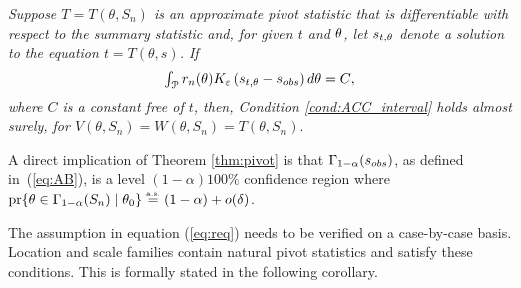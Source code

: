 \noindent
\begin{thm} \label{thm:pivot} 
{\it Suppose $T = T(\theta, S_{n})$ is an approximate pivot statistic that is differentiable with respect to the summary statistic and, for given $t$ and $\btheta$,  let $s_{t, \btheta}$ denote a solution to the equation $t = T(\theta, s)$.  If 
		\begin{equation}\label{eq:req}
		\hbox{$\int_{\cal{P}}  r_{n}(\theta) K_{ \veps}\left(s_{t, \theta}-s_{\rm obs}\right)   d \theta = C$},
		\end{equation}
		where $C$ is a constant free of $t$,
		then, Condition \ref{cond:ACC_interval} holds almost surely, for $V(\theta, S_n) = W(\theta,S_{n}) = T( \theta, S_{n}).$ }
\end{thm} 

A direct implication of Theorem \ref{thm:pivot} is that $\Gamma_{1 - \alpha}(s_{\rm obs})$, as defined in~(\ref{eq:AB}), is a level  $(1 - \alpha)100\%$ confidence region where $\text{pr}\{\theta \in \Gamma_{1 - \alpha}(S_n) \mid  \btheta_0 \}  \stackrel{\hbox{\tiny a.s.}} = (1 - \alpha) + o(\delta)$.
	
The assumption in equation (\ref{eq:req}) needs to be verified on a case-by-case basis. 
Location and scale families contain natural pivot statistics and satisfy these conditions. This is formally stated in the following corollary. 	

